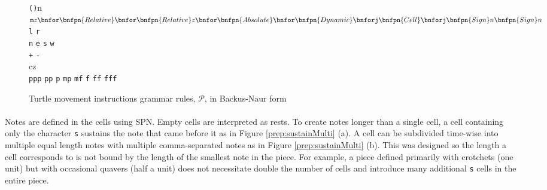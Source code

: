 \newenvironment{bnfsplit}[1][0.7\textwidth]
 {\minipage[t]{#1}$}
 {$\endminipage}

\begin{figure}[ht]
\renewcommand{\models}{::=}
\begin{bnf*}
  {
   }\\
    {
    \bnfor {}
     }\\
   {
   \texttt{(}\texttt{)}n
   \bnfor {}
    }\\
    {
    \begin{bnfsplit}
    \texttt{m}z
    \bnfor \bnfpn{Relative}
    \bnfor \bnfpn{Relative}z
    \bnfor \bnfpn{Absolute}
    \bnfor \bnfpn{Dynamic}
    \\ \bnfor \texttt{j}\bnfpn{Cell}
    \bnfor \texttt{j}\bnfpn{Sign}n\bnfpn{Sign}n
    \end{bnfsplit}
     }\\
     {
     \texttt{l}
     \bnfor \texttt{r}
      }\\
    {
    \texttt{n}
    \bnfor \texttt{e}
    \bnfor \texttt{s}
    \bnfor \texttt{w}
     }\\
   {
   \texttt{+}
   \bnfor \texttt{-}
    }\\
    {
    cz
     }\\
   {
   \texttt{ppp}
   \bnfor \texttt{pp}
   \bnfor \texttt{p}
   \bnfor \texttt{mp}
   \bnfor \texttt{mf}
   \bnfor \texttt{f}
   \bnfor \texttt{ff}
   \bnfor \texttt{fff}
    }\\
\end{bnf*}
\vspace{-35pt}
\caption{Turtle movement instructions grammar rules, $\mathcal{P}$, in Backus-Naur form~\cite{bnf}}
\label{fig:grammar}
\end{figure}

\paragraph{} Notes are defined in the cells using SPN. Empty cells are interpreted as rests. To create notes longer than a single cell, a cell containing only the character \texttt{s} sustains the note that came before it as in Figure \ref{prep:sustainMulti} (a). A cell can be subdivided time-wise into multiple equal length notes with multiple comma-separated notes as in Figure \ref{prep:sustainMulti} (b). This was designed so the length a cell corresponds to is not bound by the length of the smallest note in the piece. For example, a piece defined primarily with crotchets (one unit) but with occasional quavers (half a unit) does not necessitate double the number of cells and introduce many additional \texttt{s} cells in the entire piece.

